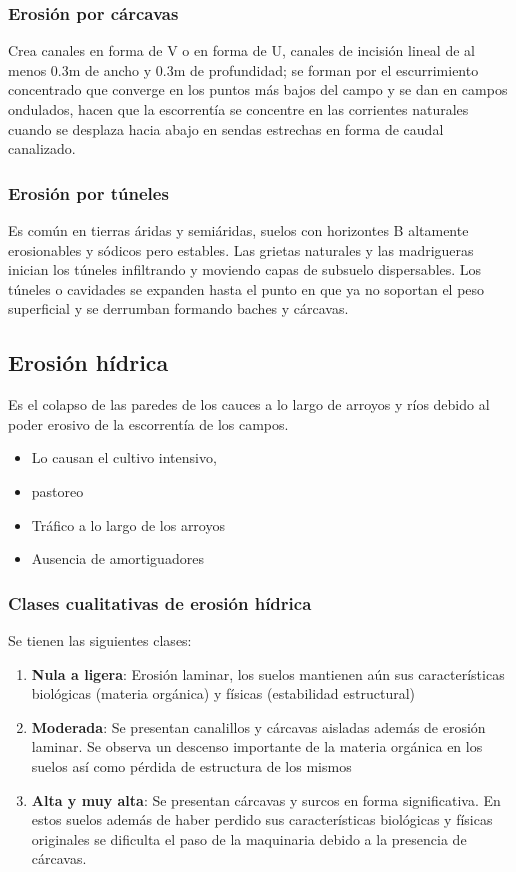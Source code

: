     \subsubsection{Erosión por cárcavas}
    Crea canales en forma de V o en forma de U, canales de incisión lineal de al menos 0.3m de ancho y 0.3m de profundidad; se forman por el escurrimiento concentrado que converge en los puntos más bajos del campo y se dan en campos ondulados, hacen que la escorrentía se concentre en las corrientes naturales cuando se desplaza hacia abajo en sendas estrechas en forma de caudal canalizado.
    \subsubsection{Erosión por túneles}
    Es común en tierras áridas y semiáridas, suelos con horizontes B altamente erosionables y sódicos pero estables. Las grietas naturales y las madrigueras inician los túneles infiltrando y moviendo capas de subsuelo dispersables. Los túneles o cavidades se expanden hasta el punto en que ya no soportan el peso superficial y se derrumban formando baches y cárcavas.
    \subsection{Erosión hídrica}
    Es el colapso de las paredes de los  cauces a lo largo de arroyos y ríos debido al poder erosivo de la escorrentía de los campos.
    \begin{itemize}
        \item Lo causan el cultivo intensivo,
        \item pastoreo
        \item Tráfico a lo largo de los arroyos
        \item Ausencia de amortiguadores \end{itemize}
    
    
    \subsubsection{Clases cualitativas de erosión hídrica}
    Se tienen las siguientes clases:
    \begin{enumerate}
        \item \textbf{Nula a ligera}: Erosión laminar, los suelos mantienen aún sus características biológicas (materia orgánica) y físicas (estabilidad estructural)
        \item \textbf{Moderada}: Se presentan canalillos y cárcavas aisladas además de erosión laminar. Se observa un descenso importante de la materia orgánica en los suelos así como pérdida de estructura de los mismos
        \item \textbf{Alta y muy alta}: Se presentan cárcavas y surcos en forma significativa. En estos suelos además de haber perdido sus características biológicas y físicas originales se dificulta el paso de la maquinaria debido a la presencia de cárcavas.
    \end{enumerate}
    
